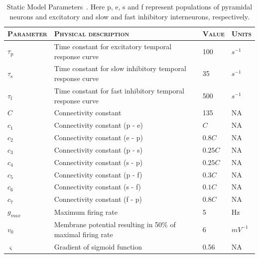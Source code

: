\singlespacing 
\footnotesize
\begin{center}%
	\begin{table}
			\caption{Static Model Parameters~\citep{wendling2002epileptic}. Here p, e, s and f represent populations of pyramidal neurons and excitatory and slow and fast inhibitory interneurons, respectively.}
		\begin{tabular}{||p{2.5cm}|p{9cm}|p{1.2cm}|p{1cm}||}\hline
			 \textsc{Parameter}  & \textsc{Physical description} & \textsc{Value} & \textsc{Units}  \\\hline\hline
			 $\tau_{\mathrm{p}}$ & Time constant for excitatory temporal response curve & 100 & $s^{-1}$\\\hline
			 $\tau_{\mathrm{s}}$ & Time constant for slow inhibitory temporal response curve & 35 & $s^{-1}$\\\hline
			 $\tau_{\mathrm{f}}$ & Time constant for fast inhibitory temporal response curve & 500 & $s^{-1}$\\\hline
			 $C$ & Connectivity constant & 135 & NA\\\hline
			 $c_{1}$ & Connectivity constant (p - e) & $C$ & NA \\\hline
			 $c_{2}$ & Connectivity constant (e - p) & $0.8C$ & NA\\\hline
			 $c_{3}$ & Connectivity constant (p - s) & $0.25C$ & NA \\\hline
			 $c_{4}$ & Connectivity constant (s - p)& $0.25C$ & NA\\\hline
			 $c_{5}$ & Connectivity constant (p - f) & $0.3C$ & NA\\\hline
			 $c_{6}$ & Connectivity constant (s - f) & $0.1C$ & NA\\\hline
			 $c_{7}$ & Connectivity constant (f - p) & $0.8C$ & NA\\\hline
			 $g_{max}$ & Maximum firing rate & 5 & Hz \\\hline
			 $v_{0}$ & Membrane potential resulting in 50\% of maximal firing rate & 6 & $mV^{-1}$\\\hline
			 $\varsigma$ & Gradient of sigmoid function & 0.56 & NA \\\hline
		\end{tabular}
		\label{tab: Static}
	\end{table}
\end{center}%
\doublespacing
\normalsize

